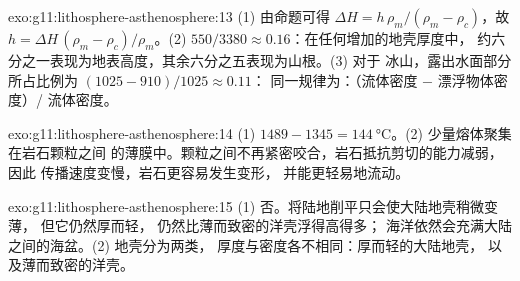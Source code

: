 \begin{solution}{exo:g11:lithosphere-asthenosphere:13}
(1) 由命题可得 $\Delta H = h\,\rho_m/(\rho_m - \rho_c)$，故 $h =
\Delta H\,(\rho_m - \rho_c)/\rho_m$。(2) $550/3380 \approx 0.16$：在任何增加的地壳厚度中，
约六分之一表现为地表高度，其余六分之五表现为山根。(3) 对于
冰山，露出水面部分所占比例为 $(1025 - 910)/1025 \approx 0.11$：
同一规律为：（流体密度 $-$ 漂浮物体密度）/
流体密度。
\end{solution}

\begin{solution}{exo:g11:lithosphere-asthenosphere:14}
(1) $1489 - 1345 = \qty{144}{\celsius}$。(2) 少量熔体聚集在岩石颗粒之间
的薄膜中。颗粒之间不再紧密咬合，岩石抵抗剪切的能力减弱，
因此 传播速度变慢，岩石更容易发生变形，
并能更轻易地流动。
\end{solution}

\begin{solution}{exo:g11:lithosphere-asthenosphere:15}
(1) 否。将陆地削平只会使大陆地壳稍微变薄，
但它仍然厚而轻，
仍然比薄而致密的洋壳浮得高得多；
海洋依然会充满大陆之间的海盆。(2) 地壳分为两类，
厚度与密度各不相同：厚而轻的大陆地壳，
以及薄而致密的洋壳。
\end{solution}

